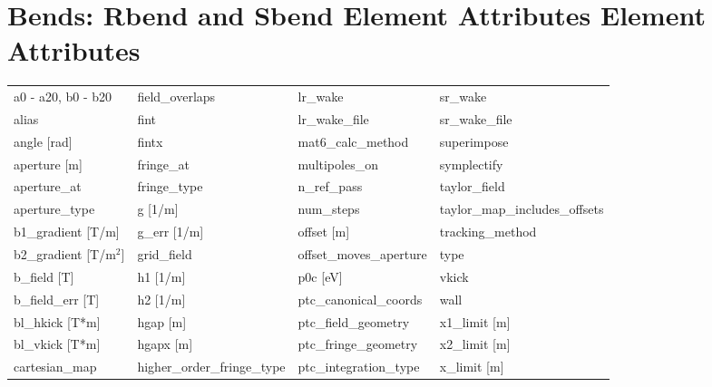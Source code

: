  \vfill
 
 \section{Bends: Rbend and Sbend Element Attributes Element Attributes}
 \label{s:list.bend}
 
 \begin{tabular}{llll} \toprule
a0 - a20, b0 - b20             & field_overlaps                 & lr_wake                        & sr_wake                        \\
alias                          & fint                           & lr_wake_file                   & sr_wake_file                   \\
angle [rad]                    & fintx                          & mat6_calc_method               & superimpose                    \\
aperture [m]                   & fringe_at                      & multipoles_on                  & symplectify                    \\
aperture_at                    & fringe_type                    & n_ref_pass                     & taylor_field                   \\
aperture_type                  & g [1/m]                        & num_steps                      & taylor_map_includes_offsets    \\
b1_gradient [T/m]              & g_err [1/m]                    & offset [m]                     & tracking_method                \\
b2_gradient [T/m$^2$]          & grid_field                     & offset_moves_aperture          & type                           \\
b_field [T]                    & h1 [1/m]                       & p0c [eV]                       & vkick                          \\
b_field_err [T]                & h2 [1/m]                       & ptc_canonical_coords           & wall                           \\
bl_hkick [T*m]                 & hgap [m]                       & ptc_field_geometry             & x1_limit [m]                   \\
bl_vkick [T*m]                 & hgapx [m]                      & ptc_fringe_geometry            & x2_limit [m]                   \\
cartesian_map                  & higher_order_fringe_type       & ptc_integration_type           & x_limit [m]                    \\

\end{tabular}
